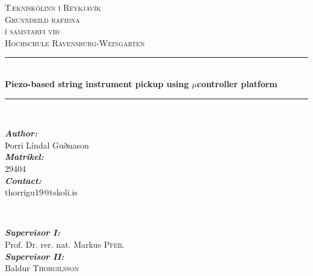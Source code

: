\documentclass{article}
\begin{document}
\begin{titlepage}

\newcommand{\HRule}{\rule{\linewidth}{0.5mm}} %

\center %
 

%


\textsc{\LARGE Tækniskólinn í Reykjavík}\\[0.5cm] %
\textsc{\large Grunndeild rafiðna}\\[0.5cm] %
\textsc{\large í samstarfi við}\\[0.5cm]
\textsc{\LARGE Hochschule Ravensburg-Weingarten}\\[0.5cm] %


\HRule \\[0.4cm]
{ \huge \bfseries Piezo-based string instrument pickup using $\mu$controller platform}\\[0.4cm] %
\HRule \\[0.4cm]

\begin{minipage}{0.4\textwidth}
\begin{flushleft} \large
\textbf{\emph{Author:}}\\
Þorri Líndal {Guðnason} \\ %
\textbf{\emph{Matrikel:}} \\
29404 \\
\textbf{\emph{Contact:}} \\
thorrigu19@tskoli.is
\end{flushleft}
\end{minipage}
~
\begin{minipage}{0.4\textwidth}
\begin{flushright} \large
\textbf{\emph{Supervisor I:}} \\
Prof. Dr. rer. nat. Markus \textsc{Pfeil}\\ %
\textbf{\emph{Supervisor II:}} \\
Baldur \textsc{Thorgilsson} %
\end{flushright}
\end{minipage}\\[2cm]


\end{titlepage}
\end{document}
